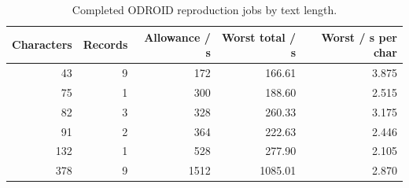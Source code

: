 \begin{table}[!htbp]\centering\small
\begin{tabular}{rrrrr}\toprule
\textbf{Characters} & \textbf{Records} & \textbf{Allowance / s} & \textbf{Worst total / s} & \textbf{Worst / s per char}\\\midrule
43 & 9 & 172 & 166.61 & 3.875\\
75 & 1 & 300 & 188.60 & 2.515\\
82 & 3 & 328 & 260.33 & 3.175\\
91 & 2 & 364 & 222.63 & 2.446\\
132 & 1 & 528 & 277.90 & 2.105\\
378 & 9 & 1512 & 1085.01 & 2.870\\
\bottomrule\end{tabular}
\caption{Completed ODROID reproduction jobs by text length.}\label{tab:res-r3-confirmed}
\end{table}
